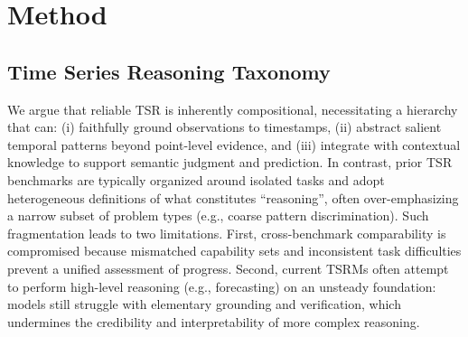 \documentclass[11pt]{article}
\begin{document}
\section{Method}
\subsection{Time Series Reasoning Taxonomy}
We argue that reliable TSR is inherently compositional, necessitating a hierarchy that can: (i) faithfully ground observations to timestamps, (ii) abstract salient temporal patterns beyond point-level evidence, and (iii) integrate with contextual knowledge to support semantic judgment and prediction. 
In contrast, prior TSR benchmarks are typically organized around isolated tasks and adopt heterogeneous definitions of what constitutes ``reasoning'', often over-emphasizing a narrow subset of problem types (e.g., coarse pattern discrimination). 
Such fragmentation leads to two limitations. First, cross-benchmark comparability is compromised because mismatched capability sets and inconsistent task difficulties prevent a unified assessment of progress. Second, current TSRMs often attempt to perform high-level reasoning (e.g., forecasting) on an unsteady foundation: models still struggle with elementary grounding and verification, which undermines the credibility and interpretability of more complex reasoning. 
\end{document}
